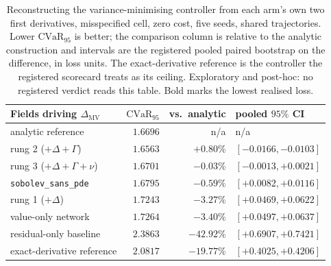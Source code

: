\documentclass{article}
\begin{document}
\begin{table}[!htbp]
\caption{Reconstructing the variance-minimising controller from each arm's own two
first derivatives, misspecified cell, zero cost, five seeds, shared trajectories.
Lower $\mathrm{CVaR}_{95}$ is better; the comparison column is relative to the
analytic construction and intervals are the registered pooled paired bootstrap on
the difference, in loss units. The exact-derivative reference is the controller the
registered scorecard treats as its ceiling. Exploratory and post-hoc: no registered
verdict reads this table. Bold marks the lowest realised loss.}
\label{tab:mv}
\centering\footnotesize\setlength{\tabcolsep}{5pt}
\begin{tabular}{@{}lrrl@{}}
\toprule
Fields driving $\Delta_{\mathrm{MV}}$ & $\mathrm{CVaR}_{95}$ & vs.\ analytic & pooled $95\%$ CI \\
\midrule
analytic reference & $1.6696$ & n/a & n/a \\
rung 2 ($+\Delta{+}\Gamma$) & $\mathbf{1.6563}$ & $+0.80\%$ & $[-0.0166, -0.0103]$ \\
rung 3 ($+\Delta{+}\Gamma{+}\nu$) & $1.6701$ & $-0.03\%$ & $[-0.0013, +0.0021]$ \\
\texttt{sobolev\_sans\_pde} & $1.6795$ & $-0.59\%$ & $[+0.0082, +0.0116]$ \\
rung 1 ($+\Delta$) & $1.7243$ & $-3.27\%$ & $[+0.0469, +0.0622]$ \\
value-only network & $1.7264$ & $-3.40\%$ & $[+0.0497, +0.0637]$ \\
residual-only baseline & $2.3863$ & $-42.92\%$ & $[+0.6907, +0.7421]$ \\
\midrule
exact-derivative reference & $2.0817$ & $-19.77\%$ & $[+0.4025, +0.4206]$ \\
\bottomrule
\end{tabular}
\end{table}
\end{document}
